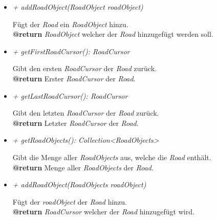\begin{itemize}
                \item  \textit{+ addRoadObject(RoadObject roadObject)}
                    \begin{leftbar}[0.9\linewidth]
                        Fügt der \textit{Road} ein \textit{RoadObject} hinzu.\\
                        \textbf{@return} \textit{RoadObject} welcher der \textit{Road} hinzugefügt werden soll.\\
                    \end{leftbar}
            
                \item  \textit{+ getFirstRoadCursor(): RoadCursor}
                    \begin{leftbar}[0.9\linewidth]
                        Gibt den ersten \textit{RoadCursor} der \textit{Road} zurück.\\
                        \textbf{@return} Erster \textit{RoadCursor} der \textit{Road}.\\
                    \end{leftbar}
            
                \item  \textit{+ getLastRoadCursor(): RoadCursor}
                    \begin{leftbar}[0.9\linewidth]
                        Gibt den letzten \textit{RoadCursor} der \textit{Road} zurück.\\
                        \textbf{@return} Letzter \textit{RoadCursor} der \textit{Road}.\\
                    \end{leftbar}
            
                \item  \textit{+ getRoadObjects(): Collection<RoadObjects>}
                    \begin{leftbar}[0.9\linewidth]
                        Gibt die Menge aller \textit{RoadObjects} aus, welche die \textit{Road} enthält.\\
                        \textbf{@return} Menge aller \textit{RoadObjects} der \textit{Road}.\\
                    \end{leftbar}
            
                \item  \textit{+ addRoadObject(RoadObjects roadObject)}
                    \begin{leftbar}[0.9\linewidth]
                        Fügt der \textit{roadObject} der \textit{Road} hinzu.\\
                        \textbf{@return} \textit{RoadCursor} welcher der \textit{Road} hinzugefügt wird.\\
                    \end{leftbar}
            \end{itemize}

